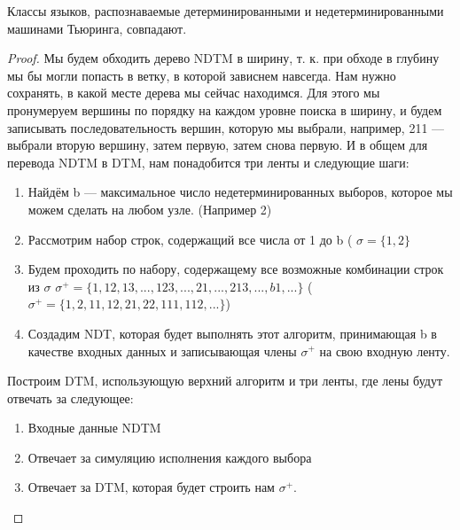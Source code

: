     \begin{Thm}
    Классы языков, распознаваемые детерминированными и недетерминированными машинами Тьюринга, совпадают.
    \end{Thm}
    \begin{proof}
        \par Мы будем обходить дерево NDTM в ширину, т. к. при обходе в глубину мы бы могли попасть в ветку, в которой зависнем навсегда. Нам нужно сохранять, в какой месте дерева мы сейчас находимся. Для этого мы пронумеруем вершины по порядку на каждом уровне поиска в ширину, и будем записывать последовательность вершин, которую мы выбрали, например, 211 --- выбрали вторую вершину, затем первую, затем снова первую. И в общем для перевода NDTM в  DTM, нам понадобится три ленты и следующие шаги:
        \begin{enumerate}
            \item Найдём b --- максимальное число недетерминированных выборов, которое мы можем сделать на любом узле. (Например 2)
            \item Рассмотрим набор строк, содержащий все числа от 1 до b ( $\sigma = \{1, 2\} $
            \item Будем проходить по набору, содержащему все возможные комбинации строк из $\sigma$ $\sigma^+ = \{1, 12, 13, ..., 123, ..., 21, ..., 213, ..., b1, ...\}$ ($\sigma^+ = \{1, 2, 11, 12, 21, 22, 111, 112, ...\}$)
            \item Создадим NDT, которая будет выполнять этот алгоритм, принимающая b в качестве входных данных и записывающая члены $\sigma^+$ на свою входную ленту.
        \end{enumerate}

        \par Построим DTM, использующую верхний алгоритм и три ленты, где лены будут отвечать за следующее:
        \begin{enumerate}
            \item Входные данные NDTM
            \item Отвечает за симуляцию исполнения каждого выбора 
            \item Отвечает за DTM, которая будет строить нам $\sigma^+$.
        \end{enumerate}


\end{proof}
